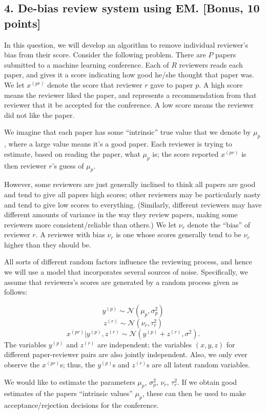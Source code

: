 \documentclass[12pt]{article}
\begin{document}
\subsection*{4. De-bias review system using EM. [Bonus, 10 points]} 

In this question, we will develop an algorithm to remove individual reviewer's bias from their score. Consider the following problem. There are $P$ papers submitted to a machine learning conference. Each of $R$ reviewers reads each paper, and gives it a score indicating how good he/she thought that paper was. We let $x^{(pr)}$ denote the score that reviewer $r$ gave to paper $p$. A high score means the reviewer liked the paper, and represents a recommendation from that reviewer that it be accepted for the conference. A low score means the reviewer did not like the paper.

We imagine that each paper has some ``intrinsic'' true value that we denote by $\mu_p$, where a large value means it's a good paper. Each reviewer is trying to estimate, based on reading the paper, what $\mu_p$ is; the score reported $x^{(pr)}$ is then reviewer $r$'s guess of $\mu_p$.

However, some reviewers are just generally inclined to think all papers are good and tend to give all papers high scores; other reviewers may be particularly nasty and tend to give low scores to everything. (Similarly, different reviewers may have different amounts of variance in the way they review papers, making some reviewers more consistent/reliable than others.) We let $\nu_r$ denote the ``bias'' of reviewer $r$. A reviewer with bias $\nu_r$ is one whose scores generally tend to be $\nu_r$ higher than they should be.

All sorts of different random factors influence the reviewing process, and hence we will use a model that incorporates several sources of noise. Specifically, we assume that reviewers's scores are generated by a random process given as follows:

\[
y^{(p)} \sim \mathcal{N}(\mu_p, \sigma_p^2)
\]
\[
z^{(r)} \sim \mathcal{N}(\nu_r, \tau_r^2)
\]
\[
x^{(pr)}|y^{(p)}, z^{(r)} \sim\mathcal{N}(y^{(p)}+ z^{(r)}, \sigma^2).
\]
The variables $y^{(p)}$ and $z^{(r)}$ are independent; the variables $(x,y,z)$ for different paper-reviewer pairs are also jointly independent. Also, we only ever observe the $x^{(pr)}$s; thus, the $y^{(p)}$s and $z^{(r)}$s are all latent random variables.
 
We would like to estimate the parameters $\mu_p$, $\sigma_p^2$, $\nu_r$, $\tau_r^2$. If we obtain good estimates of the papers ``intrinsic values'' $\mu_p$, these can then be used to make acceptance/rejection decisions for the conference. 
\end{document}
